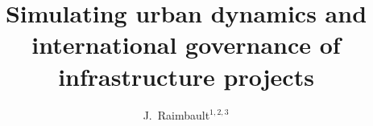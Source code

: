 \documentclass[12pt]{iopart}
\begin{document}
\title{Simulating urban dynamics and international governance of infrastructure projects}

\author{J.~Raimbault$^{1,2,3}$}

\address{$^{1}$Center for Advanced Spatial Analysis, University College London\\
$^{2}$UPS CNRS 3611 Complex Systems Institute Paris\\
$^{3}$UMR CNRS 8504 G{\'e}ographie-cit{\'e}s}

\vspace{10pt}

\begin{abstract}

\end{abstract}
\end{document}
